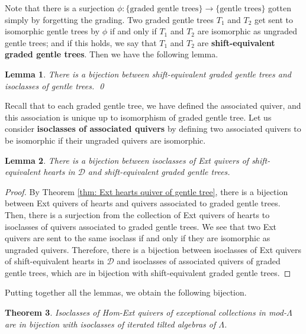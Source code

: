 \documentclass[12pt]{amsart}
\newtheorem{thm}{Theorem}[section]
\newtheorem{lem}[thm]{Lemma}
\theoremstyle{definition}
\theoremstyle{remark}
\numberwithin{equation}{section}
\newcommand{\cD}{\ensuremath{{\mathcal{D}}}}
\begin{document}
Note that there is a surjection $\phi:\{\text{graded gentle trees}\} \rightarrow \{\text{gentle trees}\}$ gotten simply by forgetting the grading. Two graded gentle trees $T_1$ and $T_2$ get sent to isomorphic gentle trees by $\phi$ if and only if $T_1$ and $T_2$ are isomorphic as ungraded gentle trees; and if this holds, we say that $T_1$ and $T_2$ are \textbf{shift-equivalent graded gentle trees}. Then we have the following lemma.

\begin{lem}\label{lem: graded trees and gentle trees}
    There is a bijection between shift-equivalent graded gentle trees and isoclasses of gentle trees. \hfill \qed
\end{lem}

Recall that to each graded gentle tree, we have defined the associated quiver, and this association is unique up to isomorphism of graded gentle tree. Let us consider \textbf{isoclasses of associated quivers} by defining two associated quivers to be isomorphic if their ungraded quivers are isomorphic.

\begin{lem}\label{lem: hearts and graded trees}
    There is a bijection between isoclasses of Ext quivers of shift-equivalent hearts in $\cD$ and shift-equivalent graded gentle trees.
\end{lem}

\begin{proof}
    By Theorem \ref{thm: Ext hearts quiver of gentle tree}, there is a bijection between Ext quivers of hearts and quivers associated to graded gentle trees. Then, there is a surjection from the collection of Ext quivers of hearts to isoclasses of quivers associated to graded gentle trees. We see that two Ext quivers are sent to the same isoclass if and only if they are isomorphic as ungraded quivers. Therefore, there is a bijection between isoclasses of Ext quivers of shift-equivalent hearts in $\cD$ and isoclasses of associated quivers of graded gentle trees, which are in bijection with shift-equivalent graded gentle trees.
\end{proof}

Putting together all the lemmas, we obtain the following bijection.

\begin{thm}\label{thm: bij bw H-E and ITA}
    Isoclasses of Hom-Ext quivers of exceptional collections in mod-$\Lambda$ are in bijection with isoclasses of iterated tilted algebras of $\Lambda$.
\end{thm}
\end{document}

